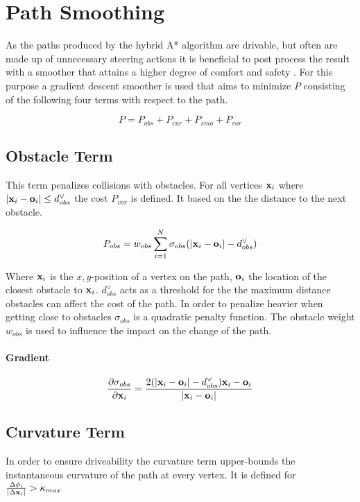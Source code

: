 \section{Path Smoothing}
As the paths produced by the hybrid A* algorithm are drivable, but often are made up of unnecessary steering actions it is beneficial to post process the result with a smoother that attains a higher degree of comfort and safety \cite{Dolgov.2008,Dolgov.2010}. For this purpose a gradient descent smoother is used that aims to minimize $P$ consisting of the following four terms with respect to the path.

\begin{equation}
P = P_{obs} + P_{cur} + P_{smo} + P_{vor}
\end{equation}

\subsection{Obstacle Term}

This term penalizes collisions with obstacles. For all vertices $\mathbf{x}_i$ where $|\mathbf{x}_i - \mathbf{o}_i| \leq d_{obs}^{\lor}$ the cost $P_{vor}$ is defined. It based on the the distance to the next obstacle.

\begin{equation}
P_{obs} = w_{obs} \displaystyle\sum_{i=1}^{N} \sigma_{obs}(|\mathbf{x}_i-\mathbf{o}_i|-d_{obs}^{\lor})
\end{equation}

Where $\mathbf{x}_i$ is the $x,y$-position of a vertex on the path, $\mathbf{o}_i$ the location of the closest obstacle to $\mathbf{x}_i$. $d_{obs}^{\lor}$ acts as a threshold for the the maximum distance obstacles can affect the cost of the path. In order to penalize heavier when getting close to obstacles $\sigma_{obs}$ is a quadratic penalty function. The obstacle weight $w_{obs}$ is used to influence the impact on the change of the path.

\paragraph{Gradient}

\begin{equation}
\frac{\partial \sigma_{obs}}{\partial \mathbf{x}_i} = \frac{2(|\mathbf{x}_i-\mathbf{o}_i|-d_{obs}^{\lor})\mathbf{x}_i-\mathbf{o}_i}{|\mathbf{x}_i-\mathbf{o}_i|}
\end{equation}

\subsection{Curvature Term}
In order to ensure driveability the curvature term upper-bounds the instantaneous curvature of the path at every vertex. It is defined for $\frac{\Delta\phi_i}{|\Delta\mathbf{x}_i|} > \kappa_{max}$

